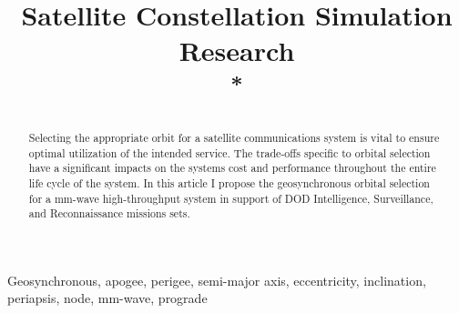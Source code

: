 \documentclass[conference]{IEEEtran}
\begin{document}
\title{Satellite Constellation Simulation Research\\
\footnotesize \textsuperscript{*}}

\author{
}

\maketitle

\begin{abstract}
Selecting the appropriate orbit for a satellite communications system is vital to ensure optimal utilization of the intended service. The trade-offs specific to orbital selection have a significant impacts on the systems cost and performance throughout the entire life cycle of the system. In this article I propose the geosynchronous orbital selection for a mm-wave high-throughput system in support of DOD Intelligence, Surveillance, and Reconnaissance missions sets.\\
\end{abstract}

\begin{IEEEkeywords}
Geosynchronous, apogee, perigee, semi-major axis, eccentricity, inclination, periapsis, node, mm-wave, prograde
\end{IEEEkeywords}
\end{document}
